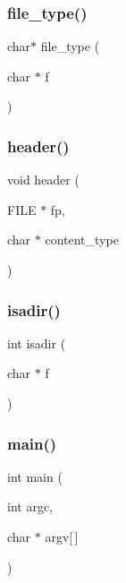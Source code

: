\mbox{\label{serwer-www_8c_a29b9ee72561809560e62a9ea307d1ff6}} 
\subsubsection{\texorpdfstring{file\_type()}{file\_type()}}
{\footnotesize\ttfamily char$\ast$ file\+\_\+type (\begin{DoxyParamCaption}\item[{char $\ast$}]{f }\end{DoxyParamCaption})}

\mbox{\label{serwer-www_8c_adc7bfb1c892aecf61c0c73f3458caf90}} 
\subsubsection{\texorpdfstring{header()}{header()}}
{\footnotesize\ttfamily void header (\begin{DoxyParamCaption}\item[{F\+I\+LE $\ast$}]{fp,  }\item[{char $\ast$}]{content\+\_\+type }\end{DoxyParamCaption})}

\mbox{\label{serwer-www_8c_a68ac50fc5196973b9f3ef7b4992f7279}} 
\subsubsection{\texorpdfstring{isadir()}{isadir()}}
{\footnotesize\ttfamily int isadir (\begin{DoxyParamCaption}\item[{char $\ast$}]{f }\end{DoxyParamCaption})}

\mbox{\label{serwer-www_8c_a0ddf1224851353fc92bfbff6f499fa97}} 
\subsubsection{\texorpdfstring{main()}{main()}}
{\footnotesize\ttfamily int main (\begin{DoxyParamCaption}\item[{int}]{argc,  }\item[{char $\ast$}]{argv\mbox{[}$\,$\mbox{]} }\end{DoxyParamCaption})}

